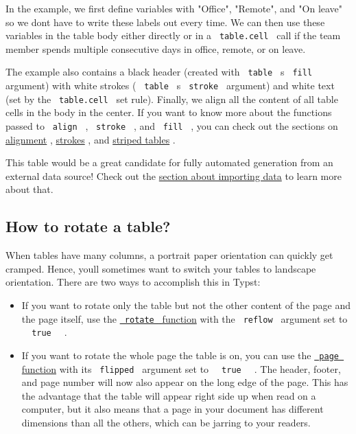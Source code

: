 In the example, we first define variables with "Office", "Remote", and
"On leave" so we don\textquotesingle t have to write these labels out
every time. We can then use these variables in the table body either
directly or in a \texttt{\ table.cell\ } call if the team member spends
multiple consecutive days in office, remote, or on leave.

The example also contains a black header (created with
\texttt{\ table\ } \textquotesingle s \texttt{\ fill\ } argument) with
white strokes ( \texttt{\ table\ } \textquotesingle s
\texttt{\ stroke\ } argument) and white text (set by the
\texttt{\ table.cell\ } set rule). Finally, we align all the content of
all table cells in the body in the center. If you want to know more
about the functions passed to \texttt{\ align\ } , \texttt{\ stroke\ } ,
and \texttt{\ fill\ } , you can check out the sections on
\href{/docs/reference/layout/alignment/}{alignment} ,
\hyperref[stroke-functions]{strokes} , and \hyperref[fills]{striped
tables} .

This table would be a great candidate for fully automated generation
from an external data source! Check out the
\hyperref[importing-data]{section about importing data} to learn more
about that.

\subsection{How to rotate a table?}\label{rotate-table}

When tables have many columns, a portrait paper orientation can quickly
get cramped. Hence, you\textquotesingle ll sometimes want to switch your
tables to landscape orientation. There are two ways to accomplish this
in Typst:

\begin{itemize}
\tightlist
\item
  If you want to rotate only the table but not the other content of the
  page and the page itself, use the
  \href{/docs/reference/layout/rotate/}{\texttt{\ rotate\ } function}
  with the \texttt{\ reflow\ } argument set to
  \texttt{\ }{\texttt{\ true\ }}\texttt{\ } .
\item
  If you want to rotate the whole page the table is on, you can use the
  \href{/docs/reference/layout/page/}{\texttt{\ page\ } function} with
  its \texttt{\ flipped\ } argument set to
  \texttt{\ }{\texttt{\ true\ }}\texttt{\ } . The header, footer, and
  page number will now also appear on the long edge of the page. This
  has the advantage that the table will appear right side up when read
  on a computer, but it also means that a page in your document has
  different dimensions than all the others, which can be jarring to your
  readers.
\end{itemize}


